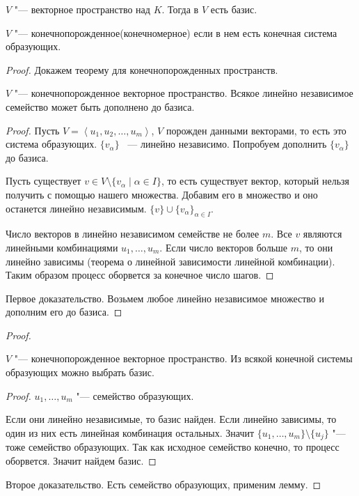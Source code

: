 \begin{theorem}
	$V$ "--- векторное пространство над $K$.
	Тогда в $V$ есть базис.
\end{theorem}

\begin{Def}
	$V$ "--- конечнопорожденное(конечномерное) если в нем есть
	конечная система образующих.
\end{Def}
\begin{proof}
	Докажем теорему для конечнопорожденных пространств.

	\begin{lemma}
		$V$ "--- конечнопорожденное векторное пространство.
		Всякое линейно независимое семейство может быть дополнено до базиса.
	\end{lemma}
	\begin{proof}
		Пусть $V = \left<u_1, u_2, \dots, u_m\right>$, $V$ порожден данными векторами, то есть это система образующих.
		$\{v_{\alpha}\}$ ~--- линейно независимо.
		Попробуем дополнить $\{v_{\alpha}\}$ до базиса.

		Пусть существует $v \in V \setminus \{v_{\alpha} \mid \alpha \in I\}$, то есть существует вектор,
		который нельзя получить с помощью нашего множества.
		Добавим его в множество и оно останется линейно независимым.
		$\{v\} \cup \{v_{\alpha}\}_{\alpha \in I}$.

		Число векторов в линейно независимом семействе не более $m$.
		Все $v$ являются линейными комбинациями $u_1, \dots, u_m$.
		Если число векторов больше $m$, то они линейно зависимы (теорема о линейной зависимости линейной комбинации).
		Таким образом процесс оборвется за конечное число шагов.
	\end{proof}

	Первое доказательство.
	Возьмем любое линейно независимое множество и дополним его до базиса.
\end{proof}

\begin{proof}
	\begin{lemma}
		$V$ "--- конечнопорожденное векторное пространство.
		Из всякой конечной системы образующих можно выбрать базис.
	\end{lemma}

	\begin{proof}
		$u_1, \dots, u_m$ "--- семейство образующих.

		Если они линейно независимые, то базис найден.
		Если линейно зависимы, то один из них есть линейная комбинация остальных.
		Значит $\{u_1, \dots, u_m\} \setminus \{u_j\}$ "--- тоже семейство образующих.
		Так как исходное семейство конечно, то процесс оборвется. Значит найдем базис.
	\end{proof}

	Второе доказательство.
	Есть семейство образующих, применим лемму.
\end{proof}

